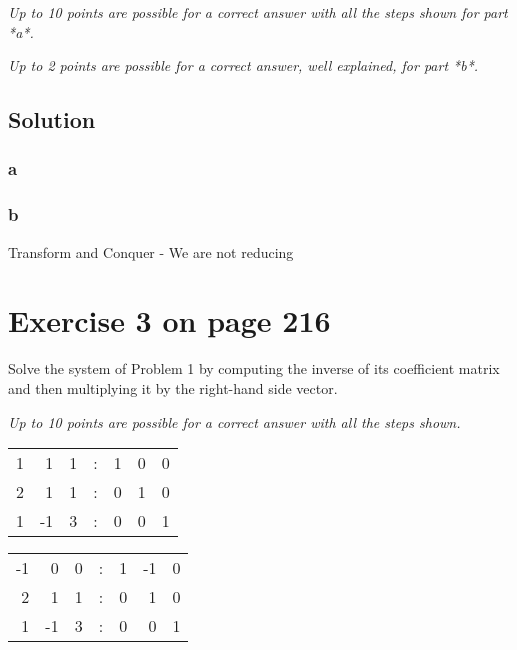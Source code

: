\documentclass[11pt]{article}
\begin{document}
\emph{Up to 10 points are possible for a correct answer with all the steps shown for part *a*.}

\emph{Up to 2 points are possible for a correct answer, well explained, for part *b*.}

\subsection*{Solution}
\label{sec-2.1}

\subsubsection*{a}
\label{sec-2.1.1}

\subsubsection*{b}
\label{sec-2.1.2}

Transform and Conquer - We are not reducing
\section*{Exercise 3 on page 216}
\label{sec-3}


Solve the system of Problem 1 by computing the inverse of its
coefficient matrix and then multiplying it by the right-hand side
vector.

\emph{Up to 10 points are possible for a correct answer with all the steps shown.}

\begin{center}
\begin{tabular}{rrrlrrr}
 1  &   1  &  1  &  :  &  1  &  0  &  0  \\
 2  &   1  &  1  &  :  &  0  &  1  &  0  \\
 1  &  -1  &  3  &  :  &  0  &  0  &  1  \\
\end{tabular}
\end{center}





\begin{center}
\begin{tabular}{rrrlrrr}
 -1  &   0  &  0  &  :  &  1  &  -1  &  0  \\
  2  &   1  &  1  &  :  &  0  &   1  &  0  \\
  1  &  -1  &  3  &  :  &  0  &   0  &  1  \\
\end{tabular}
\end{center}
\end{document}
